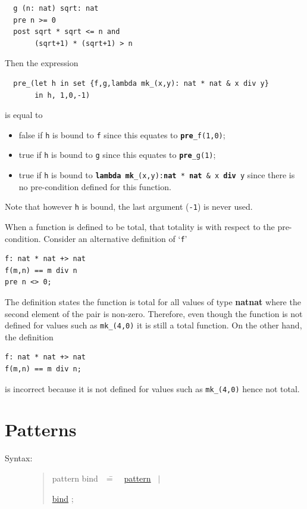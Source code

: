 \documentclass{overturerepchap}
\newcommand{\Rule}[2]{
  \begin{quote}\begin{tabbing}
    #1\index{#1}\ \ \= = \ \ \= #2  ; %

  \end{tabbing}\end{quote}
  }
\newcommand{\Ruleref}[1]{
  \hyperlink{rule:#1}{#1}}
\newcommand{\dsepl}{\ $|$\ }
\newcommand{\keyw}[1]{{\bf\ttfamily #1}}
\begin{document}
{\begin{description}
\begin{lstlisting}
  g (n: nat) sqrt: nat
  pre n >= 0
  post sqrt * sqrt <= n and
       (sqrt+1) * (sqrt+1) > n
  \end{lstlisting}
  Then the expression
  \begin{lstlisting}
  pre_(let h in set {f,g,lambda mk_(x,y): nat * nat & x div y}
       in h, 1,0,-1)
  \end{lstlisting}
  is equal to
  \begin{itemize}
  \item false if \texttt{h} is bound to \texttt{f} since this equates
        to \texttt{\keyw{pre}\_f(1,0)};
  \item true if \texttt{h} is bound to \texttt{g} since this equates
        to \texttt{\keyw{pre}\_g(1)};
  \item true if \texttt{h} is bound to
        \texttt{\keyw{lambda} \keyw{mk}\_(x,y):\keyw{nat} * \keyw{nat} \& x \keyw{div} y} since there is no
        pre-condition defined for this function.
  \end{itemize}
  Note that however \texttt{h} is bound, the last argument
  (\texttt{-1}) is never used.

When a function is defined to be total, that totality is with respect to the pre-condition.
Consider an alternative definition of `{\tt f}'

\begin{lstlisting}
f: nat * nat +> nat
f(m,n) == m div n
pre n <> 0; 
\end{lstlisting}

The definition states the function is total for all values of type \keyw{nat}{\tt *}\keyw{nat} where the second element of the pair is non-zero.
Therefore, even though the function is not defined for values such as {\tt mk\_(4,0)} it is still a total function.
On the other hand, the definition
\begin{lstlisting}
f: nat * nat +> nat
f(m,n) == m div n;
\end{lstlisting}
is incorrect because it is not defined for values such as {\tt mk\_(4,0)} hence not total.  


\end{description}


\chapter{Patterns}\label{patterns}

\begin{description}
\item[Syntax:]
  \Rule{pattern bind}{
    \Ruleref{pattern} \dsepl
    \Ruleref{bind}
    }


\end{description}}
\end{document}
